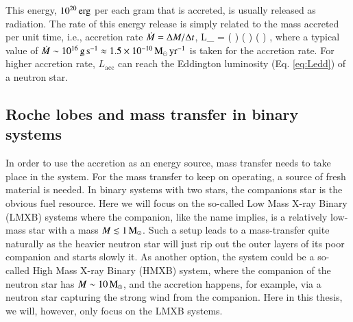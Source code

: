This energy, $10^{20} \, \mathrm{erg}$ per each gram that is accreted, is usually released as radiation.
The rate of this energy release is simply related to the mass accreted per unit time, i.e., accretion rate $\dot{M} = \Delta M/ \Delta t$, 
\be
L_{} = \Mdot {} \approx {} \left(  \right) \left(  \right) \left(  \right) \ergs,
\ee
where a typical value of $\dot{M} \sim 10^{16} \, \mathrm{g}\,\mathrm{s}^{-1} \approx 1.5 \times 10^{-10} \, \mathrm{M}_{\odot}\,\mathrm{yr}^{-1}$ is taken for the accretion rate.
For higher accretion rate, $L_{\mathrm{acc}}$ can reach the Eddington luminosity (Eq. \eqref{eq:Ledd}) of a neutron star.



\subsection{Roche lobes and mass transfer in binary systems}

In order to use the accretion as an energy source, mass transfer needs to take place in the system.
For the mass transfer to keep on operating, a source of fresh material is needed.
In binary systems with two stars, the companions star is the obvious fuel resource.
Here we will focus on the so-called Low Mass X-ray Binary (LMXB) systems where the companion, like the name implies, is a relatively low-mass star with a mass $M \lesssim 1 \, \mathrm{M}_{\odot}$.\cite{TH06}
Such a setup leads to a mass-transfer quite naturally as the heavier neutron star will just rip out the outer layers of its poor companion and starts slowly  it. 
As another option, the system could be a so-called High Mass X-ray Binary (HMXB) system, where the companion of the neutron star has $M \sim 10\, \mathrm{M}_{\odot}$, and the accretion happens, for example, via a neutron star capturing the strong wind from the companion.
Here in this thesis, we will, however, only focus on the LMXB systems.


